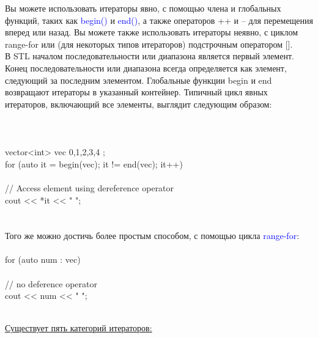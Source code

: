 \documentclass[a4paper,10pt]{article}
\begin{document}
Вы можете использовать итераторы явно, с помощью члена и глобальных функций, таких как \textcolor{blue}{begin()} и \textcolor{blue}{end()}, а также операторов ++ и -- для перемещения вперед или назад. Вы можете также использовать итераторы неявно, с циклом range-for или (для некоторых типов итераторов) подстрочным оператором [].\\

В STL началом последовательности или диапазона является первый элемент. Конец последовательности или диапазона всегда определяется как элемент, следующий за последним элементом. Глобальные функции begin и end возвращают итераторы в указанный контейнер. Типичный цикл явных итераторов, включающий все элементы, выглядит следующим образом:\\
\\
\\

\hline
\\
vector<int> vec{ 0,1,2,3,4 };  
\\for (auto it = begin(vec); it != end(vec); it++)  
\\  
\\    // Access element using dereference operator  
\\    cout << *it << " ";  
\\  

\hline
\\
\\

Того же можно достичь более простым способом, с помощью цикла \textcolor{blue}{range-for}:
\\


\hline
\\for (auto num : vec)  
 \\   {  
  \\      // no deference operator  
  \\      cout << num << " ";  
 \\   }

\hline
\\

\underline{Существует пять категорий итераторов:}
\\
\end{document}
